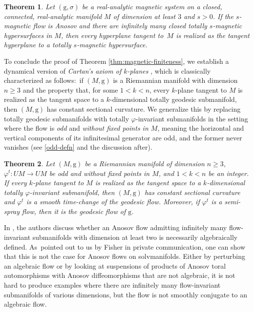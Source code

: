 \documentclass[10pt,a4paper]{amsart}
\newcommand{\g}{\mathrm{g}}
\numberwithin{equation}{section}
\newtheorem{theoremA}{Theorem}
\theoremstyle{definition}
\begin{document}
\begin{theoremA} \label{thm:vol-preserving2}
 Let $(\g, \sigma)$ be a real-analytic magnetic system on a closed, connected, real-analytic manifold $M$ of dimension at least $3$ and $s > 0$. If the $s$-magnetic flow is Anosov and there are infinitely many closed totally $s$-magnetic hypersurfaces in $M$, then \emph{every} hyperplane tangent to~$M$ is realized as the tangent hyperplane to a totally $s$-magnetic hypersurface.
\end{theoremA}

To conclude the proof of Theorem \ref{thm:magnetic-finiteness}, we establish a dynamical version of \emph{Cartan's axiom of \mbox{$k$-planes}} \cite[Theorem 1.16]{dajczer-tojeiro}, which is classically characterized as follows:\ if $(M,\g)$ is a Riemannian manifold with dimension $n \geq 3$ and the property that, for some $1<k<n$, every $k$-plane tangent to $M$ is realized as the tangent space to a $k$-dimensional totally geodesic submanifold, then $(M,\g)$ has constant sectional curvature. We generalize this by replacing totally geodesic submanifolds with totally \mbox{$\varphi$-in\-va\-ri\-ant} submanifolds in the setting where the flow is \emph{odd} and \emph{without fixed points in $M$}, meaning the horizontal and vertical components of its infinitesimal generator are odd, and the former never vanishes (see \eqref{odd-defn} and the discussion after).

\begin{theoremA}\label{dyn-Cartan}
 Let $(M,\g)$ be a Riemannian manifold of dimension $n \geq 3$, $\varphi^t\colon UM\to UM$ be odd and without fixed points in $M$, and $1<k<n$ be an integer. If every $k$-plane tangent to $M$ is realized as the tangent space to a $k$-dimensional totally $\varphi$-invariant submanifold, then $(M,\g)$ has constant sectional curvature and $\varphi^t$ is a smooth time-change of the geodesic flow. Moreover, if $\varphi^t$ is a semi-spray flow, then it is the geodesic flow of $\g$.
\end{theoremA}


In \cite[Section 4.2]{filip2024finiteness}, the authors discuss whether an Anosov flow admitting infinitely many flow-invariant submanifolds with dimension at least two is necessarily algebraically defined. As~pointed out to us by Fisher in private communication, one can show that this is not the case for Anosov flows on solvmanifolds. Either by perturbing an algebraic flow or by looking at suspensions of products of Anosov toral automorphisms with Anosov diffeomorphisms that are not algebraic, it is not hard to produce examples where there are infinitely many flow-invariant submanifolds of various dimensions, but the flow is not smoothly conjugate to an algebraic flow.
\end{document}
